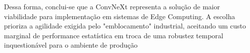 Dessa forma, conclui-se que a ConvNeXt representa a solução de maior viabilidade para implementação em sistemas de Edge Computing. A escolha prioriza a agilidade exigida pelo "emblocamento" industrial, aceitando um custo marginal de performance estatística em troca de uma robustez temporal inquestionável para o ambiente de produção